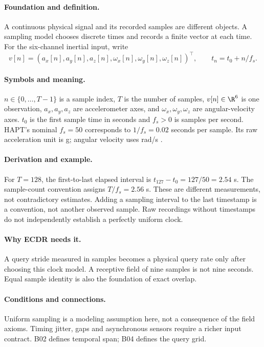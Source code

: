 \paragraph{Foundation and definition.}
A continuous physical signal and its recorded samples are different objects.
A sampling model chooses discrete times and records a finite vector at each
time. For the six-channel inertial input, write
\[
 v[n]=(a_x[n],a_y[n],a_z[n],\omega_x[n],\omega_y[n],\omega_z[n])^\top,
 \qquad t_n=t_0+n/f_s.
\]
\paragraph{Symbols and meaning.}
$n\in\{0,\ldots,T-1\}$ is a sample index, $T$ is the number of samples,
$v[n]\in\R^6$ is one observation, $a_x,a_y,a_z$ are accelerometer axes,
and $\omega_x,\omega_y,\omega_z$ are angular-velocity axes. $t_0$ is the
first sample time in seconds and $f_s>0$ is samples per second. HAPT's
nominal $f_s=50$ corresponds to $1/f_s=0.02$ seconds per sample. Its raw
acceleration unit is g; angular velocity uses rad/s \cite{hapt}.
\paragraph{Derivation and example.}
For $T=128$, the first-to-last elapsed interval is
$t_{127}-t_0=127/50=2.54$ s. The sample-count convention assigns
$T/f_s=2.56$ s. These are different measurements, not contradictory
estimates. Adding a sampling interval to the last timestamp is a convention,
not another observed sample. Raw recordings without timestamps do not
independently establish a perfectly uniform clock.
\paragraph{Why ECDR needs it.}
A query stride measured in samples becomes a physical query rate only after
choosing this clock model. A receptive field of nine samples is not nine
seconds. Equal sample identity is also the foundation of exact overlap.
\paragraph{Conditions and connections.}
Uniform sampling is a modeling assumption here, not a consequence of the
field axioms. Timing jitter, gaps and asynchronous sensors require a richer
input contract. B02 defines temporal span; B04 defines the query grid.

